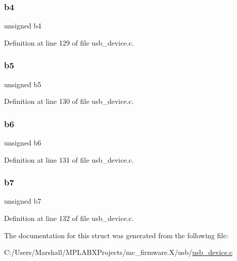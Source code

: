 \mbox{\label{structuint8__t___v_a_l_1_1_____p_a_c_k_e_d_a02783ce5c818bd5feee68ec745a658ea}} 
\subsubsection{\texorpdfstring{b4}{b4}}
{\footnotesize\ttfamily unsigned b4}



Definition at line 129 of file usb\+\_\+device.\+c.

\mbox{\label{structuint8__t___v_a_l_1_1_____p_a_c_k_e_d_aabfdfc34204bc98e9f2228285847ec9f}} 
\subsubsection{\texorpdfstring{b5}{b5}}
{\footnotesize\ttfamily unsigned b5}



Definition at line 130 of file usb\+\_\+device.\+c.

\mbox{\label{structuint8__t___v_a_l_1_1_____p_a_c_k_e_d_a36234c4fc61c0ce84b860356586340a9}} 
\subsubsection{\texorpdfstring{b6}{b6}}
{\footnotesize\ttfamily unsigned b6}



Definition at line 131 of file usb\+\_\+device.\+c.

\mbox{\label{structuint8__t___v_a_l_1_1_____p_a_c_k_e_d_a52df3becc9eb59ad64eb7a4acad36c01}} 
\subsubsection{\texorpdfstring{b7}{b7}}
{\footnotesize\ttfamily unsigned b7}



Definition at line 132 of file usb\+\_\+device.\+c.



The documentation for this struct was generated from the following file\+:\begin{DoxyCompactItemize}
\item 
C\+:/\+Users/\+Marshall/\+M\+P\+L\+A\+B\+X\+Projects/mc\+\_\+firmware.\+X/usb/\mbox{\hyperlink{usb__device_8c}{usb\+\_\+device.\+c}}\end{DoxyCompactItemize}
